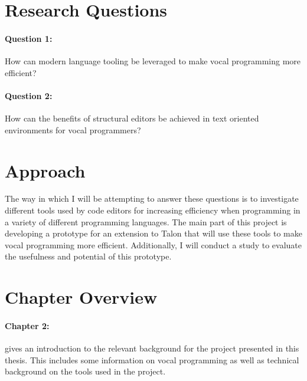 \documentclass[../thesis.tex]{subfiles}
\begin{document}

\newpage
\section{Research Questions}
\paragraph{Question 1:}
How can modern language tooling be leveraged to make vocal programming more efficient?
\paragraph{Question 2:}
How can the benefits of structural editors be achieved in text oriented environments for vocal programmers?

\section{Approach}
The way in which I will be attempting to answer these questions is to
investigate different tools used by code editors for increasing efficiency
when programming in a variety of different programming languages.
The main part of this project is developing a prototype for an extension
to Talon that will use these tools to make vocal programming more efficient.
Additionally, I will conduct a study to evaluate the usefulness and potential
of this prototype.

\section{Chapter Overview}
\paragraph{Chapter 2: } gives an introduction to the relevant background for the project presented in this thesis.
This includes some information on vocal programming as well as technical background on the tools used in the project.
\end{document}
